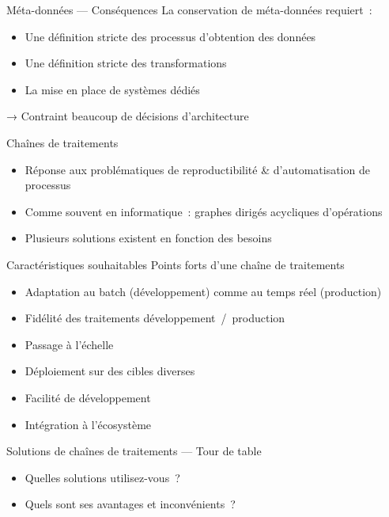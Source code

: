 \begin{frame}{Méta-données — Conséquences}
  La conservation de méta-données requiert~:

  \begin{itemize}
    \item Une définition stricte des processus d'obtention des données
    \item Une définition stricte des transformations
    \item La mise en place de systèmes dédiés
  \end{itemize}

  → Contraint beaucoup de décisions d'architecture
\end{frame}

\begin{frame}{Chaînes de traitements}
  \begin{itemize}
    \item Réponse aux problématiques de reproductibilité \& d'automatisation de processus
    \item Comme souvent en informatique~: graphes dirigés acycliques d'opérations
    \item Plusieurs solutions existent en fonction des besoins
  \end{itemize}
\end{frame}

\begin{frame}{Caractéristiques souhaitables}
  Points forts d'une chaîne de traitements
  \begin{itemize}
    \item Adaptation au batch (développement) comme au temps réel (production)
    \item Fidélité des traitements développement~/~production
    \item Passage à l'échelle
    \item Déploiement sur des cibles diverses
    \item Facilité de développement
    \item Intégration à l'écosystème
  \end{itemize}
\end{frame}

\begin{frame}{Solutions de chaînes de traitements — Tour de table}
  \begin{itemize}
    \item Quelles solutions utilisez-vous~?
    \item Quels sont ses avantages et inconvénients~?
  \end{itemize}
\end{frame}

